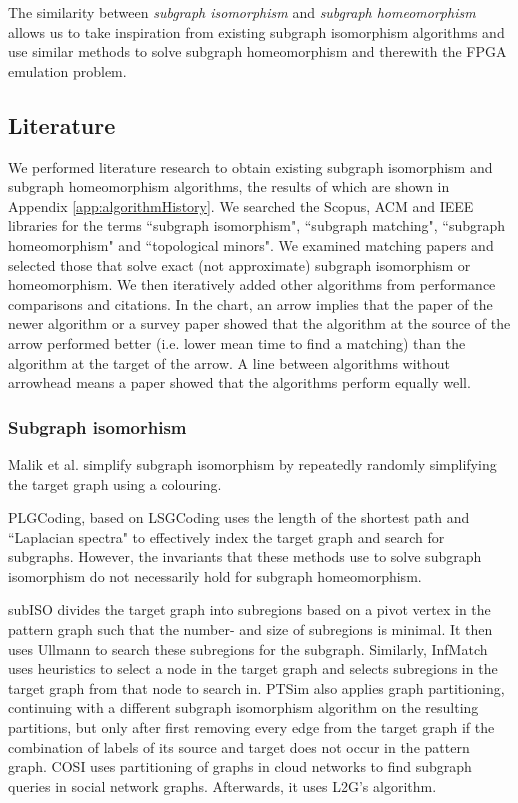 The similarity between \textit{subgraph isomorphism} and \textit{subgraph homeomorphism} allows us to take inspiration from existing subgraph isomorphism algorithms and use similar methods to solve subgraph homeomorphism and therewith the FPGA emulation problem.

\subsection{Literature}
We performed literature research to obtain existing subgraph isomorphism and subgraph homeomorphism algorithms, the results of which are shown in Appendix \ref{app:algorithmHistory}. We searched the Scopus, ACM and IEEE libraries for the terms ``subgraph isomorphism", ``subgraph matching", ``subgraph homeomorphism" and ``topological minors". We examined matching papers and selected those that solve exact (not approximate) subgraph isomorphism or homeomorphism. We then iteratively added other algorithms from performance comparisons and citations. In the chart, an arrow implies that the paper of the newer algorithm or a survey paper showed that the algorithm at the source of the arrow performed better (i.e. lower mean time to find a matching) than the algorithm at the target of the arrow. A line between algorithms without arrowhead means a paper showed that the algorithms perform equally well.	


\subsubsection{Subgraph isomorhism}

Malik et al.\cite{Malik2019} simplify subgraph isomorphism by repeatedly randomly simplifying the target graph using a colouring.

PLGCoding\cite{Zhu2019}, based on LSGCoding\cite{Zhu20111272} uses the length of the shortest path and ``Laplacian spectra" to effectively index the target graph and search for subgraphs. However, the invariants that these methods use to solve subgraph isomorphism do not necessarily hold for subgraph homeomorphism.

subISO\cite{8711459} divides the target graph into subregions based on a pivot vertex in the pattern graph such that the number- and size of subregions is minimal. It then uses Ullmann\cite{ullmann1976} to search these subregions for the subgraph. Similarly, InfMatch\cite{Ma2019} uses heuristics to select a node in the target graph and selects subregions in the target graph from that node to search in. PTSim\cite{Xie2017} also applies graph partitioning, continuing with a different subgraph isomorphism algorithm on the resulting partitions, but only after first removing every edge from the target graph if the combination of labels of its source and target does not occur in the pattern graph. COSI\cite{5562766} uses partitioning of graphs in cloud networks to find subgraph queries in social network graphs. Afterwards, it uses L2G's algorithm\cite{Almasri2015}.

